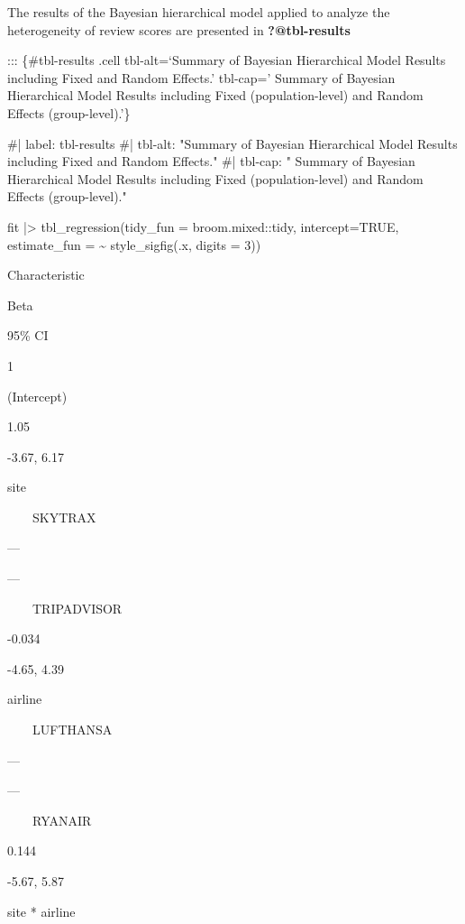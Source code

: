 \documentclass[
]{agujournal2019}
\newenvironment{Shaded}{\begin{snugshade}}{\end{snugshade}}
\newcommand{\AttributeTok}[1]{\textcolor[rgb]{0.40,0.45,0.13}{#1}}
\newcommand{\CommentTok}[1]{\textcolor[rgb]{0.37,0.37,0.37}{#1}}
\newcommand{\ConstantTok}[1]{\textcolor[rgb]{0.56,0.35,0.01}{#1}}
\newcommand{\DecValTok}[1]{\textcolor[rgb]{0.68,0.00,0.00}{#1}}
\newcommand{\FunctionTok}[1]{\textcolor[rgb]{0.28,0.35,0.67}{#1}}
\newcommand{\NormalTok}[1]{\textcolor[rgb]{0.00,0.23,0.31}{#1}}
\newcommand{\SpecialCharTok}[1]{\textcolor[rgb]{0.37,0.37,0.37}{#1}}
\begin{document}
The results of the Bayesian hierarchical model applied to analyze the
heterogeneity of review scores are presented in \textbf{?@tbl-results}

::: \{\#tbl-results .cell tbl-alt=`Summary of Bayesian Hierarchical
Model Results including Fixed and Random Effects.' tbl-cap=' Summary of
Bayesian Hierarchical Model Results including Fixed (population-level)
and Random Effects (group-level).'\}

\begin{Shaded}
\begin{Highlighting}[]
\CommentTok{\#| label: tbl{-}results}
\CommentTok{\#| tbl{-}alt: "Summary of Bayesian Hierarchical Model Results including Fixed and Random Effects."}
\CommentTok{\#| tbl{-}cap: " Summary of Bayesian Hierarchical Model Results including Fixed (population{-}level) and Random Effects (group{-}level)."}

\NormalTok{fit }\SpecialCharTok{|\textgreater{}} \FunctionTok{tbl\_regression}\NormalTok{(}\AttributeTok{tidy\_fun =}\NormalTok{ broom.mixed}\SpecialCharTok{::}\NormalTok{tidy,}
                      \AttributeTok{intercept=}\ConstantTok{TRUE}\NormalTok{,}
                      \AttributeTok{estimate\_fun =} \SpecialCharTok{\textasciitilde{}} \FunctionTok{style\_sigfig}\NormalTok{(.x, }\AttributeTok{digits =} \DecValTok{3}\NormalTok{))}
\end{Highlighting}
\end{Shaded}

Characteristic

Beta

95\% CI

{1}

(Intercept)

1.05

-3.67, 6.17

site

~~~~SKYTRAX

---

---

~~~~TRIPADVISOR

-0.034

-4.65, 4.39

airline

~~~~LUFTHANSA

---

---

~~~~RYANAIR

0.144

-5.67, 5.87

site * airline
\end{document}
